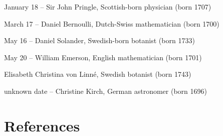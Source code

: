 January 18 -- Sir John Pringle, Scottish-born physician (born 1707)

March 17 -- Daniel Bernoulli, Dutch-Swiss mathematician (born 1700)

May 16 -- Daniel Solander, Swedish-born botanist (born 1733)

May 20 -- William Emerson, English mathematician (born 1701)

Elisabeth Christina von Linné, Swedish botanist (born 1743)

unknown date -- Christine Kirch, German astronomer (born 1696)

\section{References}\label{references}
